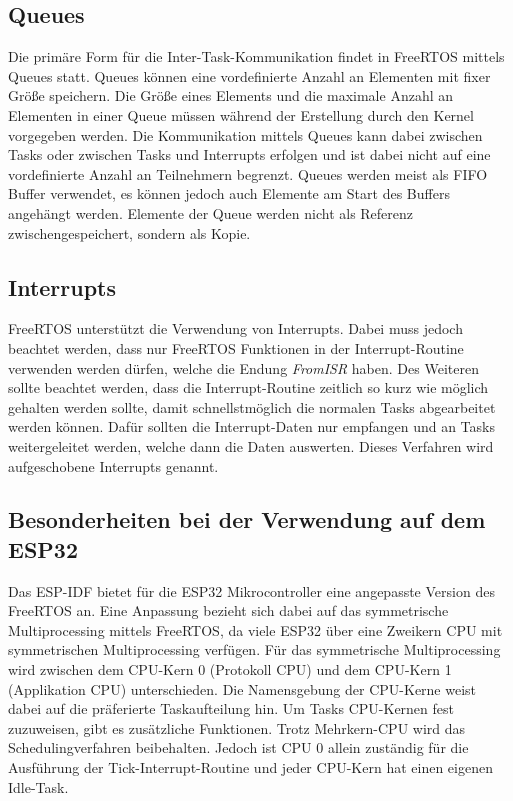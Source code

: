 \subsection{Queues}
Die primäre Form für die Inter-Task-Kommunikation findet in FreeRTOS mittels Queues statt. Queues können eine vordefinierte Anzahl an Elementen mit fixer Größe speichern. Die Größe eines Elements und die maximale Anzahl an Elementen in einer Queue müssen während der Erstellung durch den Kernel vorgegeben werden. Die Kommunikation mittels Queues kann dabei zwischen Tasks oder zwischen Tasks und Interrupts erfolgen und ist dabei nicht auf eine vordefinierte Anzahl an Teilnehmern begrenzt. Queues werden meist als \ac{FIFO} Buffer verwendet, es können jedoch auch Elemente am Start des Buffers angehängt werden. Elemente der Queue werden nicht als Referenz zwischengespeichert, sondern als Kopie. \cites[S.~104ff.]{barryFreeRTOS}{freeRTOSQueues}

\subsection{Interrupts}
FreeRTOS unterstützt die Verwendung von Interrupts. Dabei muss jedoch beachtet werden, dass nur FreeRTOS Funktionen in der Interrupt-Routine verwenden werden dürfen, welche die Endung \textit{FromISR} haben. Des Weiteren sollte beachtet werden, dass die Interrupt-Routine zeitlich so kurz wie möglich gehalten werden sollte, damit schnellstmöglich die normalen Tasks abgearbeitet werden können. Dafür sollten die Interrupt-Daten nur empfangen und an Tasks weitergeleitet werden, welche dann die Daten auswerten. Dieses Verfahren wird aufgeschobene Interrupts genannt. \cites[S.~185]{barryFreeRTOS}[S.~195]{barryFreeRTOS}

\subsection{Besonderheiten bei der Verwendung auf dem ESP32}
Das \ac{ESP-IDF} bietet für die ESP32 Mikrocontroller eine angepasste Version des FreeRTOS an. Eine Anpassung bezieht sich dabei auf das symmetrische Multiprocessing mittels FreeRTOS, da viele ESP32 über eine Zweikern \acs{CPU} mit symmetrischen Multiprocessing verfügen. Für das symmetrische Multiprocessing wird zwischen dem \acs{CPU}-Kern 0 (Protokoll \acs{CPU}) und dem \acs{CPU}-Kern 1 (Applikation \acs{CPU}) unterschieden. Die Namensgebung der \acs{CPU}-Kerne weist dabei auf die präferierte Taskaufteilung hin. Um Tasks \acs{CPU}-Kernen fest zuzuweisen, gibt es zusätzliche Funktionen. Trotz Mehrkern-\acs{CPU} wird das Schedulingverfahren beibehalten. Jedoch ist \acs{CPU} 0 allein zuständig für die Ausführung der Tick-Interrupt-Routine und jeder \acs{CPU}-Kern hat einen eigenen Idle-Task. \cites{espressifSMP}{espressifFreeRTOS}

